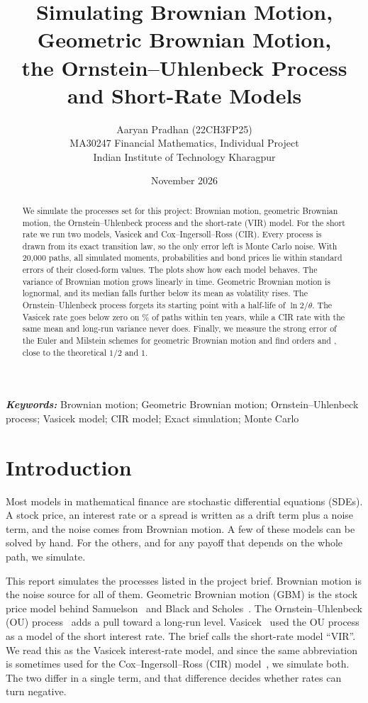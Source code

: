 \documentclass[11pt]{article}
\title{Simulating Brownian Motion, Geometric Brownian Motion,\\
the Ornstein--Uhlenbeck Process and Short-Rate Models}
\author{Aaryan Pradhan (22CH3FP25)\\[6pt]
\small MA30247 Financial Mathematics, Individual Project\\
\small Indian Institute of Technology Kharagpur}
\date{November 2026}
\begin{document}
\maketitle

\begin{abstract}
\noindent We simulate the processes set for this project: Brownian motion, geometric Brownian
motion, the Ornstein--Uhlenbeck process and the short-rate (VIR) model. For the short rate we
run two models, Vasicek and Cox--Ingersoll--Ross (CIR). Every process is drawn from its exact
transition law, so the only error left is Monte Carlo noise. With 20{,}000 paths, all \NChecks{}
simulated moments, probabilities and bond prices lie within \MaxZ{} standard errors of their
closed-form values. The plots show how each model behaves. The variance of Brownian motion grows
linearly in time. Geometric Brownian motion is lognormal, and its median falls further below its
mean as volatility rises. The Ornstein--Uhlenbeck process forgets its starting point with a
half-life of $\ln 2/\theta$. The Vasicek rate goes below zero on \PNegEver\% of paths within ten
years, while a CIR rate with the same mean and long-run variance never does. Finally, we measure
the strong error of the Euler and Milstein schemes for geometric Brownian motion and find orders
\EulerOrder{} and \MilsteinOrder, close to the theoretical $1/2$ and $1$.
\end{abstract}

\noindent\textbf{\textit{Keywords:}} Brownian motion; Geometric Brownian motion;
Ornstein--Uhlenbeck process; Vasicek model; CIR model; Exact simulation; Monte Carlo

\section{Introduction}

Most models in mathematical finance are stochastic differential equations (SDEs). A stock price,
an interest rate or a spread is written as a drift term plus a noise term, and the noise comes
from Brownian motion. A few of these models can be solved by hand. For the others, and for any
payoff that depends on the whole path, we simulate.

This report simulates the processes listed in the project brief. Brownian motion is the noise
source for all of them. Geometric Brownian motion (GBM) is the stock price model behind
Samuelson~\cite{samuelson1965} and Black and Scholes~\cite{black1973}. The Ornstein--Uhlenbeck
(OU) process~\cite{uhlenbeck1930} adds a pull toward a long-run level. Vasicek~\cite{vasicek1977}
used the OU process as a model of the short interest rate. The brief calls the short-rate model
``VIR''. We read this as the Vasicek interest-rate model, and since the same abbreviation is
sometimes used for the Cox--Ingersoll--Ross (CIR) model~\cite{cox1985}, we simulate both. The
two differ in a single term, and that difference decides whether rates can turn negative.
\end{document}
